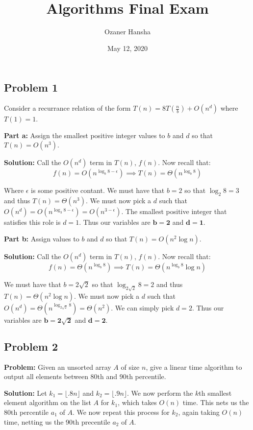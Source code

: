 \documentclass{article}
\begin{document}
\title{Algorithms Final Exam}
\author{Ozaner Hansha}
\date{May 12, 2020}
\maketitle

\subsection*{Problem 1}
Consider a recurrance relation of the form $T(n)=8T\left(\frac{n}{b}\right)+O(n^d)$ where $T(1)=1$.
\bigskip

\noindent\textbf{Part a:} Assign the smallest positive integer values to $b$ and $d$ so that $T(n)=O(n^3)$.
\bigskip

\noindent\textbf{Solution:} Call the $O(n^d)$ term in $T(n)$, $f(n)$. Now recall that:
$$f(n)=O(n^{\log_b 8-\epsilon})\implies T(n)=\Theta(n^{\log_b 8})$$

Where $\epsilon$ is some positive contant. We must have that $b=2$ so that $\log_2 8=3$ and thus $T(n)=\Theta(n^3)$. We must now pick a $d$ such that $O(n^d)=O(n^{\log_3 8-\epsilon})=O(n^{3-\epsilon})$. The smallest positive integer that satisfies this role is $d=1$. Thus our variables are $\bm{b=2}$ and $\bm{d=1}$.
\bigskip

\noindent\textbf{Part b:} Assign values to $b$ and $d$ so that $T(n)=O(n^2\log n)$.

\bigskip

\noindent\textbf{Solution:} Call the $O(n^d)$ term in $T(n)$, $f(n)$. Now recall that:
$$f(n)=\Theta(n^{\log_b 8})\implies T(n)=\Theta(n^{\log_b 8}\log n)$$

We must have that $b=2\sqrt{2}$ so that $\log_{2\sqrt{2}} 8=2$ and thus $T(n)=\Theta(n^2\log n)$. We must now pick a $d$ such that $O(n^d)=\Theta(n^{\log_{2\sqrt{2}} 8})=\Theta(n^2)$. We can simply pick $d=2$. Thus our variables are $\bm{b=2\sqrt{2}}$ and $\bm{d=2}$.

\subsection*{Problem 2}
\noindent\textbf{Problem:} Given an unsorted array $A$ of size $n$, give a linear time algorithm to output all elements between 80th and 90th percentile.
\bigskip

\noindent\textbf{Solution:} Let $k_1=\lfloor.8n\rfloor$ and $k_2=\lfloor.9n\rfloor$. We now perform the $k$th smallest element algorithm on the list $A$ for $k_1$, which takes $O(n)$ time. This nets us the 80th percentile $a_1$ of $A$. We now repeat this process for $k_2$, again taking $O(n)$ time, netting us the 90th precentile $a_2$ of $A$.
\end{document}
